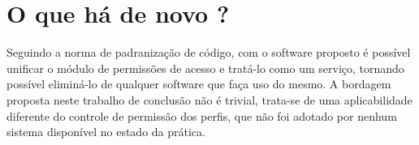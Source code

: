\section{O que há de novo ?}\label{sec:novidades} %


Seguindo a norma de padranização de código, com o software proposto é possível unificar o módulo de permissões de acesso e tratá-lo como um serviço, tornando possível eliminá-lo de qualquer software que faça uso do mesmo. A bordagem proposta neste trabalho de conclusão não é trivial, trata-se de uma aplicabilidade diferente do controle de permissão dos perfis, que não foi adotado por nenhum sistema disponível no estado da prática.